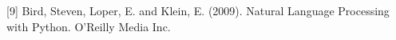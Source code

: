 \documentclass{article} %
\begin{document}
{[9] Bird, Steven, Loper, E. and Klein, E. (2009). Natural Language Processing with Python. O’Reilly Media Inc.





%
%



}
\end{document}
